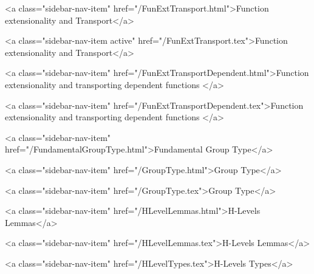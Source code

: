      
    
      
        
          <a class="sidebar-nav-item" href="/FunExtTransport.html">Function extensionality and Transport</a>
        
      
    
      
        
          <a class="sidebar-nav-item active" href="/FunExtTransport.tex">Function extensionality and Transport</a>
        
      
    
      
        
          <a class="sidebar-nav-item" href="/FunExtTransportDependent.html">Function extensionality and transporting dependent functions </a>
        
      
    
      
        
          <a class="sidebar-nav-item" href="/FunExtTransportDependent.tex">Function extensionality and transporting dependent functions </a>
        
      
    
      
        
          <a class="sidebar-nav-item" href="/FundamentalGroupType.html">Fundamental Group Type</a>
        
      
    
      
        
          <a class="sidebar-nav-item" href="/GroupType.html">Group Type</a>
        
      
    
      
        
          <a class="sidebar-nav-item" href="/GroupType.tex">Group Type</a>
        
      
    
      
        
          <a class="sidebar-nav-item" href="/HLevelLemmas.html">H-Levels Lemmas</a>
        
      
    
      
        
          <a class="sidebar-nav-item" href="/HLevelLemmas.tex">H-Levels Lemmas</a>
        
      
    
      
        
          <a class="sidebar-nav-item" href="/HLevelTypes.tex">H-Levels Types</a>
        
      
    
